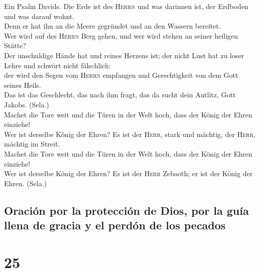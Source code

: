  Ein Psalm Davids. Die Erde ist des \textsc{Herrn} und was
darinnen ist, der Erdboden und was darauf wohnt.\\
 Denn er hat ihn an die Meere gegründet und an den Wassern
bereitet.\\
 Wer wird auf des \textsc{Herrn} Berg gehen, und wer wird
stehen an seiner heiligen Stätte?\\
 Der unschuldige Hände hat und reines Herzens ist; der
nicht Lust hat zu loser Lehre und schwört nicht fälschlich:\\
 der wird den Segen vom \textsc{Herrn} empfangen und
Gerechtigkeit von dem Gott seines Heils.\\
 Das ist das Geschlecht, das nach ihm fragt, das da sucht
dein Antlitz, Gott Jakobs. (Sela.)\\
 Machet die Tore weit und die Türen in der Welt hoch, dass
der König der Ehren einziehe!\\
 Wer ist derselbe König der Ehren? Es ist der
\textsc{Herr}, stark und mächtig, der \textsc{Herr}, mächtig im
Streit.\\
 Machet die Tore weit und die Türen in der Welt hoch, dass
der König der Ehren einziehe!\\
 Wer ist derselbe König der Ehren? Es ist der
\textsc{Herr} Zebaoth; er ist der König der Ehren. (Sela.)

\hypertarget{oraciuxf3n-por-la-protecciuxf3n-de-dios-por-la-guuxeda-llena-de-gracia-y-el-perduxf3n-de-los-pecados}{%
\subsection{Oración por la protección de Dios, por la guía llena de
gracia y el perdón de los
pecados}\label{oraciuxf3n-por-la-protecciuxf3n-de-dios-por-la-guuxeda-llena-de-gracia-y-el-perduxf3n-de-los-pecados}}

\hypertarget{section-24}{%
\section{25}\label{section-24}}

